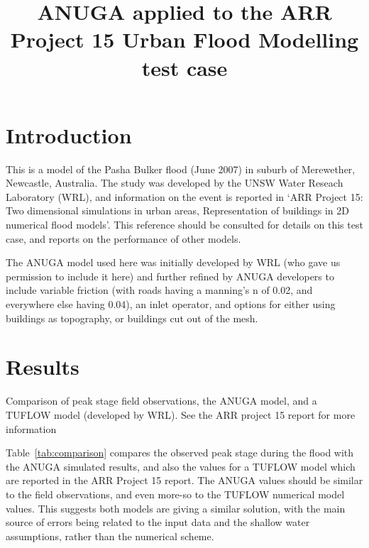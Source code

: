 \documentclass{article}
\begin{document}
\title{ANUGA applied to the ARR Project 15 Urban Flood Modelling test case}

\maketitle

\section{Introduction}
This is a model of the Pasha Bulker flood (June 2007) in suburb of Merewether,
Newcastle, Australia. The study was developed by the UNSW Water Reseach Laboratory (WRL),
and information on the event is reported in `ARR Project 15: Two
dimensional simulations in urban areas, Representation of buildings in 2D
numerical flood models'. This reference should be consulted for details on this
test case, and reports on the performance of other models. 

The ANUGA model used here was initially developed by WRL (who gave us permission to
include it here) and further refined by ANUGA developers to include variable
friction (with roads having a manning's n of 0.02, and everywhere else having
0.04), an inlet operator, and options for either using buildings as topography, or
buildings cut out of the mesh.

\section{Results}


\begin{table}[h]
\caption{Comparison of peak stage field observations, the ANUGA model, and a
TUFLOW model (developed by WRL). See the ARR project 15 report for more
information}
\label{tab:comparison}
\begin{center}
\end{center}
\end{table}

Table~\ref{tab:comparison} compares the observed peak stage during the flood with the
ANUGA simulated results, and also the values for a TUFLOW model which are reported in the ARR Project
15 report. The ANUGA values should be similar to the field observations, and
even more-so to the TUFLOW numerical model values. This suggests both models
are giving a similar solution, with the main source of errors being related to
the input data and the shallow water assumptions, rather than the numerical
scheme.
\end{document}
